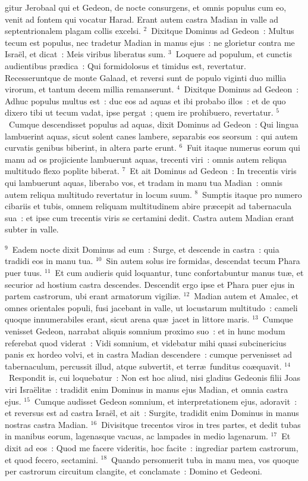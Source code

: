 \bchapter
{}gitur Jerobaal qui et Gedeon, de nocte consurgens, et omnis populus cum eo, venit ad fontem qui vocatur Harad. Erant autem castra Madian in valle ad septentrionalem plagam collis excelsi.
${}^{2}$~Dixitque Dominus ad Gedeon~: Multus tecum est populus, nec tradetur Madian in manus ejus~: ne glorietur contra me Isra\"el, et dicat~: Meis viribus liberatus sum.
${}^{3}$~Loquere ad populum, et cunctis audientibus pr\ae dica~: Qui formidolosus et timidus est, revertatur. Recesseruntque de monte Galaad, et reversi sunt de populo viginti duo millia virorum, et tantum decem millia remanserunt.
${}^{4}$~Dixitque Dominus ad Gedeon~: Adhuc populus multus est~: duc eos ad aquas et ibi probabo illos~: et de quo dixero tibi ut tecum vadat, ipse pergat~; quem ire prohibuero, revertatur.
${}^{5}$~Cumque descendisset populus ad aquas, dixit Dominus ad Gedeon~: Qui lingua lambuerint aquas, sicut solent canes lambere, separabis eos seorsum~: qui autem curvatis genibus biberint, in altera parte erunt.
${}^{6}$~Fuit itaque numerus eorum qui manu ad os projiciente lambuerunt aquas, trecenti viri~: omnis autem reliqua multitudo flexo poplite biberat.
${}^{7}$~Et ait Dominus ad Gedeon~: In trecentis viris qui lambuerunt aquas, liberabo vos, et tradam in manu tua Madian~: omnis autem reliqua multitudo revertatur in locum suum.
${}^{8}$~Sumptis itaque pro numero cibariis et tubis, omnem reliquam multitudinem abire pr\ae cepit ad tabernacula sua~: et ipse cum trecentis viris se certamini dedit. Castra autem Madian erant subter in valle.


${}^{9}$~Eadem nocte dixit Dominus ad eum~: Surge, et descende in castra~: quia tradidi eos in manu tua.
${}^{10}$~Sin autem solus ire formidas, descendat tecum Phara puer tuus.
${}^{11}$~Et cum audieris quid loquantur, tunc confortabuntur manus tu\ae , et securior ad hostium castra descendes. Descendit ergo ipse et Phara puer ejus in partem castrorum, ubi erant armatorum vigili\ae .
${}^{12}$~Madian autem et Amalec, et omnes orientales populi, fusi jacebant in valle, ut locustarum multitudo~: cameli quoque innumerabiles erant, sicut arena qu\ae\ jacet in littore maris.
${}^{13}$~Cumque venisset Gedeon, narrabat aliquis somnium proximo suo~: et in hunc modum referebat quod viderat~: Vidi somnium, et videbatur mihi quasi subcinericius panis ex hordeo volvi, et in castra Madian descendere~: cumque pervenisset ad tabernaculum, percussit illud, atque subvertit, et terr\ae\ funditus co\ae quavit.
${}^{14}$~Respondit is, cui loquebatur~: Non est hoc aliud, nisi gladius Gedeonis filii Joas viri Isra\"elit\ae~: tradidit enim Dominus in manus ejus Madian, et omnia castra ejus.
${}^{15}$~Cumque audisset Gedeon somnium, et interpretationem ejus, adoravit~: et reversus est ad castra Isra\"el, et ait~: Surgite, tradidit enim Dominus in manus nostras castra Madian.
${}^{16}$~Divisitque trecentos viros in tres partes, et dedit tubas in manibus eorum, lagenasque vacuas, ac lampades in medio lagenarum.
${}^{17}$~Et dixit ad eos~: Quod me facere videritis, hoc facite~: ingrediar partem castrorum, et quod fecero, sectamini.
${}^{18}$~Quando personuerit tuba in manu mea, vos quoque per castrorum circuitum clangite, et conclamate~: Domino et Gedeoni.



